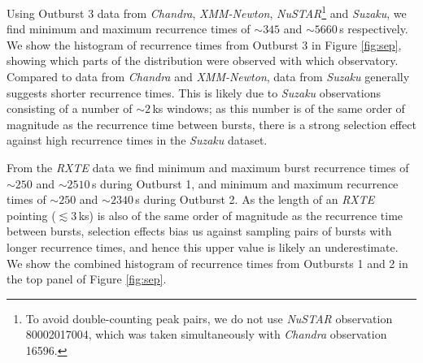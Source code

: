 \par Using Outburst 3 data from \textit{Chandra}, \textit{XMM-Newton}, \textit{NuSTAR}\footnote{To avoid double-counting peak pairs, we do not use \textit{NuSTAR} observation 80002017004, which was taken simultaneously with \textit{Chandra} observation 16596.} and \textit{Suzaku}, we find minimum and maximum recurrence times of $\sim345$ and $\sim5660$\,s respectively.  We show the histogram of recurrence times from Outburst 3 in Figure \ref{fig:sep}, showing which parts of the distribution were observed with which observatory.  Compared to data from \textit{Chandra} and \textit{XMM-Newton}, data from \textit{Suzaku} generally suggests shorter recurrence times.  This is likely due to \textit{Suzaku} observations consisting of a number of $\sim2$\,ks windows; as this number is of the same order of magnitude as the recurrence time between bursts, there is a strong selection effect against high recurrence times in the \textit{Suzaku} dataset.
\par From the \textit{RXTE} data we find minimum and maximum burst recurrence times of $\sim250$ and $\sim2510$\,s during Outburst 1, and minimum and maximum recurrence times of $\sim250$ and $\sim2340$\,s during Outburst 2.  As the length of an \textit{RXTE} pointing ($\lesssim3$\,ks) is also of the same order of magnitude as the recurrence time between bursts, selection effects bias us against sampling pairs of bursts with longer recurrence times, and hence this upper value is likely an underestimate.  We show the combined histogram of recurrence times from Outbursts 1 and 2 in the top panel of Figure \ref{fig:sep}.

